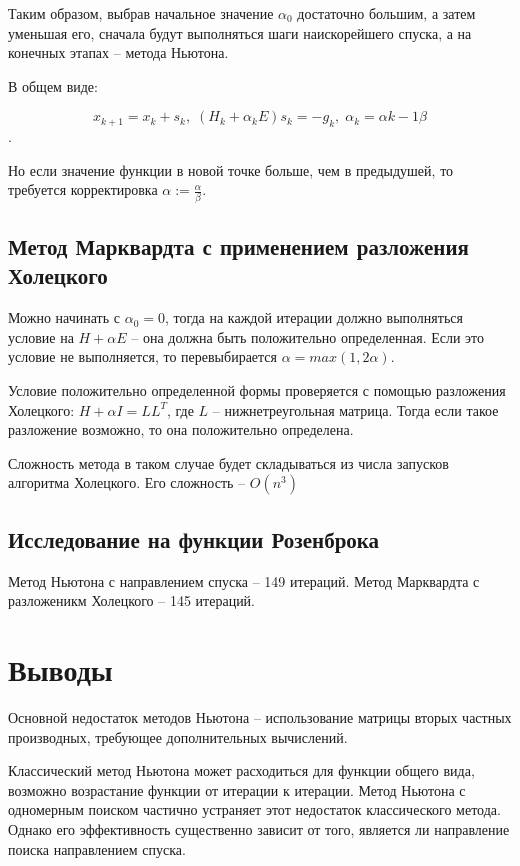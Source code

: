 \documentclass[12pt]{article}
\begin{document}
Таким образом, выбрав начальное значение $\alpha_0$ достаточно большим, а затем уменьшая его, сначала будут выполняться шаги наискорейшего спуска, а на конечных этапах -- метода Ньютона.

В общем виде:

\[ x_{k+1} = x_k + s_k, \; \left( H_k + \alpha_k E \right) s_k = -g_k, \; \alpha_k = \alpha{k-1} \beta \].

Но если значение функции в новой точке больше, чем в предыдушей, то требуется корректировка $\alpha := \frac{\alpha}{\beta}$.

\subsection{Метод Марквардта с применением разложения Холецкого}

Можно начинать с $\alpha_0 = 0$, тогда на каждой итерации должно выполняться условие на $ H+\alpha E$ -- она должна быть положительно определенная. Если это условие не выполняется, то перевыбирается $\alpha = max \left( 1, 2\alpha \right)$.

Условие положительно определенной формы проверяется с помощью разложения Холецкого: $H+\alpha I = LL^T$, где $L$ -- нижнетреугольная матрица. Тогда если такое разложение возможно, то она положительно определена.

Сложность метода в таком случае будет складываться из числа запусков алгоритма Холецкого. Его сложность -- $O(n^3)$

\subsection{Исследование на функции Розенброка}

Метод Ньютона с направлением спуска -- 149 итераций.
Метод Марквардта с разложеникм Холецкого -- 145 итераций.

\newpage
\section{Выводы}

Основной недостаток методов Ньютона -- использование матрицы вторых частных производных, требующее дополнительных вычислений.

Классический метод Ньютона может расходиться для функции общего вида, возможно возрастание функции от итерации к итерации. Метод Ньютона с одномерным поиском частично устраняет этот недостаток классического метода. Однако его эффективность существенно зависит от того, является ли направление поиска направлением спуска.
\end{document}

